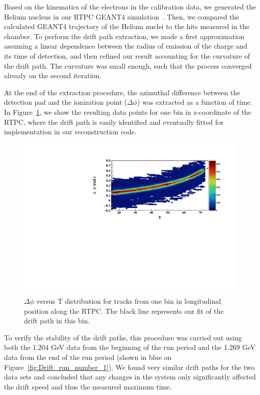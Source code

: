 \documentclass[preprint,5p]{elsarticle}
\begin{document}
Based on the kinematics of the electrons in the calibration data, we generated 
the Helium nucleus in our RTPC GEANT4 simulation~\cite{GEANT4}. Then,
we compared the calculated GEANT4 trajectory of the Helium nuclei to 
the hits measured in the chamber. To perform the drift path extraction, 
we made a first approximation assuming a linear dependence between the radius 
of emission of the charge and its time of detection, and then refined our 
result accounting for the curvature of the drift path. The curvature was small 
enough, such that the process converged already on the second iteration.

At the end of the extraction procedure, the azimuthal difference between the 
detection pad and the ionization point ($\Delta\phi$) was extracted as a 
function of time. In Figure~\ref{fig:DELTA_PHI_TDC}, we show the resulting data 
points for one bin in z-coordinate of the RTPC, where the drift path is easily 
identified and eventually fitted for implementation in our reconstruction code.

\begin{figure}[t]
\centering
\includegraphics[scale=0.48]{FitResult_p2_11.pdf}
\caption{$\Delta \phi$ versus T distribution for tracks
from one bin in longitudinal position along the RTPC. The black line represents 
our fit of the drift path in this bin.}
\label{fig:DELTA_PHI_TDC}
\end{figure}

To verify the stability of the drift paths, this procedure was carried out 
using both the 1.204 GeV data from the beginning of the run period and the 
1.269 GeV data from the end of the run period (shown in blue on 
Figure~\ref{fig:Drift_run_number_1}). We found very similar drift paths for the 
two data sets and concluded that any changes in the system only significantly 
affected the drift speed and thus the measured maximum time.
\end{document}
